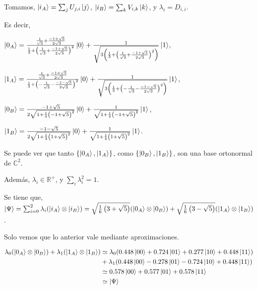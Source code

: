\documentclass[a4paper,11pt]{article}
\begin{document}
Tomamos, $\left\vert{i_A}\right\rangle = \sum_{j} U_{j,i}\left\vert{j}\right\rangle$, $\left\vert{i_B}\right\rangle = \sum_{k} V_{i,k}\left\vert{k}\right\rangle$, y $\lambda_{i} = D_{i,i}$.

Es decir, 

$\left\vert{0_A}\right\rangle = \frac{\frac{1}{\sqrt{3}} + \frac{-1+\sqrt{5}}{2\sqrt{3}}}{\frac{1}{3}+
\left ( \frac{1}{\sqrt{3}} + \frac{-1 + \sqrt{5}}{2\sqrt{3}} \right)^2} \left\vert{0}\right\rangle +
\frac{1}{\sqrt{3 \left ( \frac{1}{3} + \left ( \frac{1}{\sqrt{3}} + 
\frac{-1 + \sqrt{5}}{2\sqrt{3}}\right )^2\right )}}\left\vert{1}\right\rangle
$,

$\left\vert{1_A}\right\rangle = \frac{\frac{1}{\sqrt{3}} + \frac{-1+\sqrt{5}}{2\sqrt{3}}}{\frac{1}{3}+
\left ( -\frac{1}{\sqrt{3}} - \frac{-1 - \sqrt{5}}{2\sqrt{3}} \right)^2} \left\vert{0}\right\rangle +
\frac{1}{\sqrt{3 \left ( \frac{1}{3} + \left ( - \frac{1}{\sqrt{3}} - 
\frac{-1 - \sqrt{5}}{2\sqrt{3}}\right )^2\right )}}
\left\vert{1}\right\rangle$,

$\left\vert{0_B}\right\rangle = 
\frac{-1 + \sqrt{5}}{2\sqrt{1 + \frac{1}{4}\left ( -1 + \sqrt{5}\right )^2}}\left\vert{0}\right\rangle +
\frac{1}{\sqrt{1 + \frac{1}{4}\left ( -1 + \sqrt{5}\right )^2}}\left\vert{1}\right\rangle$,

$\left\vert{1_B}\right\rangle = \frac{-1 - \sqrt{5}}{2\sqrt{1 + \frac{1}{4}\left ( 1 + \sqrt{5}\right )^2}}\left\vert{0}\right\rangle +
\frac{1}{\sqrt{1 + \frac{1}{4}\left ( 1 + \sqrt{5}\right )^2}}\left\vert{1}\right\rangle$.

Se puede ver que tanto $\{ \left\vert{0_A}\right\rangle, \left\vert{1_A}\right\rangle\}$, como $\{ \left\vert{0_B}\right\rangle, \left\vert{1_B}\right\rangle\}$, son una base ortonormal de $\mathbb{C}^2$.

Además, $\lambda_i \in \mathbb{R}^+$, y $\sum_i \lambda_i^2 = 1$.

Se tiene que, $\left\vert{\Psi}\right\rangle = \sum_{i=0}^2 \lambda_i (\left\vert{i_A}\right\rangle \otimes \left\vert{i_B}\right\rangle) = 
\sqrt{\frac{1}{6}\left ( 3 + \sqrt{5} \right )} (\left\vert{0_A}\right\rangle \otimes \left\vert{0_B}\right\rangle) +
\sqrt{\frac{1}{6}\left ( 3 - \sqrt{5} \right )} (\left\vert{1_A}\right\rangle \otimes \left\vert{1_B}\right\rangle)$.

Solo vemos que lo anterior vale mediante aproximaciones.

  \begin{align*}
    \lambda_0(\left\vert{0_A}\right\rangle \otimes \left\vert{0_B}\right\rangle) + \lambda_1 (\left\vert{1_A}\right\rangle \otimes \left\vert{1_B}\right\rangle)
    &\simeq \lambda_0 (0.448 \left\vert{00}\right\rangle + 0.724\left\vert{01}\right\rangle + 0.277\left\vert{10}\right\rangle + 0.448\left\vert{11}\right\rangle)
    \\ &+ \lambda_1 (0.448 \left\vert{00}\right\rangle - 0.278 \left\vert{01}\right\rangle - 0.724 \left\vert{10}\right\rangle + 0.448 \left\vert{11}\right\rangle)
    \\ &\simeq 0.578 \left\vert{00}\right\rangle + 0.577 \left\vert{01}\right\rangle + 0.578 \left\vert{11}\right\rangle
    \\ &\simeq \left\vert{\Psi}\right\rangle
  \end{align*}
\end{document}
